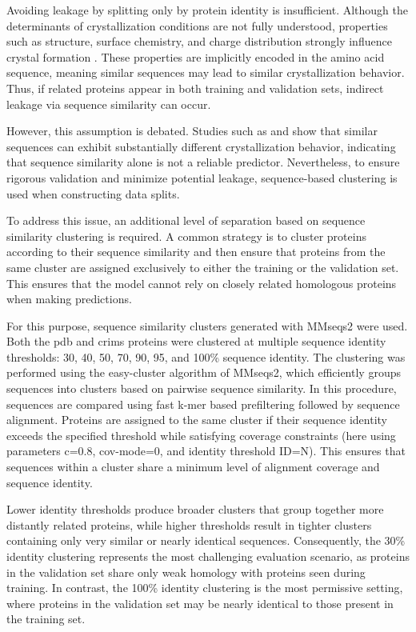 Avoiding leakage by splitting only by protein identity is insufficient. Although the determinants of crystallization conditions are not fully understood, properties such as structure, surface chemistry, and charge distribution strongly influence crystal formation \citep{Nanev2018}. These properties are implicitly encoded in the amino acid sequence, meaning similar sequences may lead to similar crystallization behavior. Thus, if related proteins appear in both training and validation sets, indirect leakage via sequence similarity can occur.

However, this assumption is debated. Studies such as \citet{Abrahams2019} and \citet{Liao2025} show that similar sequences can exhibit substantially different crystallization behavior, indicating that sequence similarity alone is not a reliable predictor. Nevertheless, to ensure rigorous validation and minimize potential leakage, sequence-based clustering is used when constructing data splits.

To address this issue, an additional level of separation based on sequence similarity clustering is required. A common strategy is to cluster proteins according to their sequence similarity and then ensure that proteins from the same cluster are assigned exclusively to either the training or the validation set. This ensures that the model cannot rely on closely related homologous proteins when making predictions.

For this purpose, sequence similarity clusters generated with MMseqs2 were used. Both the \gls{pdb} and \gls{crims} proteins were clustered at multiple sequence identity thresholds: 30, 40, 50, 70, 90, 95, and 100\% sequence identity. The clustering was performed using the easy-cluster algorithm of MMseqs2, which efficiently groups sequences into clusters based on pairwise sequence similarity. In this procedure, sequences are compared using fast k-mer based prefiltering followed by sequence alignment. Proteins are assigned to the same cluster if their sequence identity exceeds the specified threshold while satisfying coverage constraints (here using parameters c=0.8, cov-mode=0, and identity threshold ID=N). This ensures that sequences within a cluster share a minimum level of alignment coverage and sequence identity.

Lower identity thresholds produce broader clusters that group together more distantly related proteins, while higher thresholds result in tighter clusters containing only very similar or nearly identical sequences. Consequently, the 30\% identity clustering represents the most challenging evaluation scenario, as proteins in the validation set share only weak homology with proteins seen during training. In contrast, the 100\% identity clustering is the most permissive setting, where proteins in the validation set may be nearly identical to those present in the training set.

